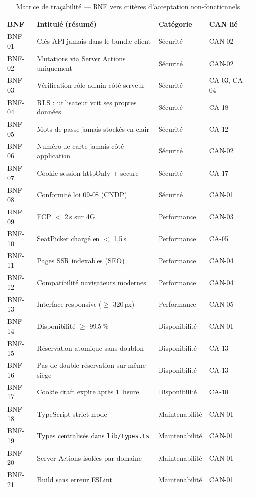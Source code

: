 \documentclass[12pt,a4paper,openany]{report}
\begin{document}
\begin{longtable}{p{1.2cm}p{5.3cm}p{2.6cm}p{2.4cm}}
  \toprule
  \textbf{BNF} & \textbf{Intitulé (résumé)} & \textbf{Catégorie} & \textbf{CAN lié} \\
  \midrule
  \endhead
  \bottomrule
  \endfoot

  BNF-01 & Clés API jamais dans le bundle client          & Sécurité       & CAN-02 \\
  BNF-02 & Mutations via Server Actions uniquement        & Sécurité       & CAN-02 \\
  BNF-03 & Vérification rôle admin côté serveur           & Sécurité       & CA-03, CA-04 \\
  BNF-04 & RLS : utilisateur voit ses propres données     & Sécurité       & CA-18 \\
  BNF-05 & Mots de passe jamais stockés en clair          & Sécurité       & CA-12 \\
  BNF-06 & Numéro de carte jamais côté application        & Sécurité       & CAN-02 \\
  BNF-07 & Cookie session httpOnly + secure               & Sécurité       & CA-17 \\
  BNF-08 & Conformité loi 09-08 (CNDP)                   & Sécurité       & CAN-01 \\
  BNF-09 & FCP $<$ 2\,s sur 4G                           & Performance    & CAN-03 \\
  BNF-10 & SeatPicker chargé en $<$ 1,5\,s               & Performance    & CA-05 \\
  BNF-11 & Pages SSR indexables (SEO)                     & Performance    & CAN-04 \\
  BNF-12 & Compatibilité navigateurs modernes             & Performance    & CAN-04 \\
  BNF-13 & Interface responsive ($\geq$ 320\,px)          & Performance    & CAN-05 \\
  BNF-14 & Disponibilité $\geq$ 99,5\,\%                  & Disponibilité  & CAN-01 \\
  BNF-15 & Réservation atomique sans doublon              & Disponibilité  & CA-13 \\
  BNF-16 & Pas de double réservation sur même siège       & Disponibilité  & CA-13 \\
  BNF-17 & Cookie draft expire après 1~heure              & Disponibilité  & CA-10 \\
  BNF-18 & TypeScript strict mode                         & Maintenabilité & CAN-01 \\
  BNF-19 & Types centralisés dans \texttt{lib/types.ts}   & Maintenabilité & CAN-01 \\
  BNF-20 & Server Actions isolées par domaine             & Maintenabilité & CAN-01 \\
  BNF-21 & Build sans erreur ESLint                       & Maintenabilité & CAN-01 \\
\caption{Matrice de traçabilité — BNF vers critères d'acceptation non-fonctionnels}
\end{longtable}
\end{document}
